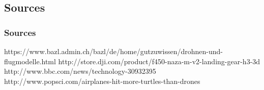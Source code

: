 \subsection{Sources}

\begin{frame}
\frametitle{Sources}


\begin{small}
https://www.bazl.admin.ch/bazl/de/home/gutzuwissen/drohnen-und-flugmodelle.html
http://store.dji.com/product/f450-naza-m-v2-landing-gear-h3-3d
http://www.bbc.com/news/technology-30932395
http://www.popsci.com/airplanes-hit-more-turtles-than-drones


\end{small}

  
\end{frame}






